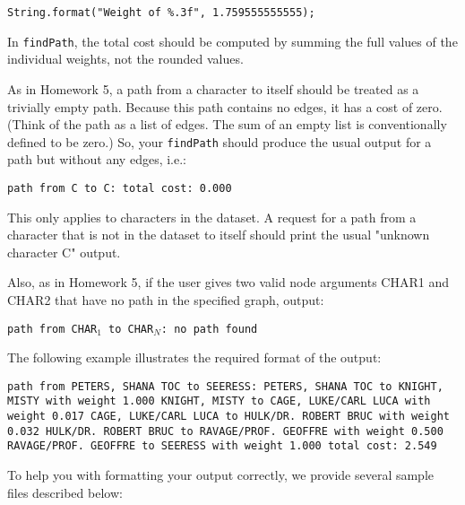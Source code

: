 \documentclass[11pt]{article}
\begin{document}
\noindent \texttt{String.format("Weight of \%.3f", 1.759555555555);}

\noindent In \texttt{findPath}, the total cost should be computed by summing the full values of the individual weights, not the rounded values.

\noindent As in Homework 5, a path from a character to itself should be treated as a trivially empty path. Because this path contains no edges, it has a cost of zero. (Think of the path as a list of edges. The sum of an empty list is conventionally defined to be zero.) So, your \texttt{findPath} should produce the usual output for a path but without any edges, i.e.:

\noindent \texttt{path from C to C:
\newline
total cost: 0.000}

\noindent This only applies to characters in the dataset. A request for a path from a character that is not in the dataset to itself should print the usual "unknown character C" output.

\noindent Also, as in Homework 5, if the user gives two valid node arguments CHAR1 and CHAR2 that have no path in the specified graph, output:

\noindent \texttt{path from CHAR$_1$ to CHAR$_N$:
\newline
no path found}

\newpage

\noindent The following example illustrates the required format of the output:

\noindent \texttt{path from PETERS, SHANA TOC to SEERESS:
\newline
PETERS, SHANA TOC to KNIGHT, MISTY with weight 1.000
\newline
KNIGHT, MISTY to CAGE, LUKE/CARL LUCA with weight 0.017
\newline
CAGE, LUKE/CARL LUCA to HULK/DR. ROBERT BRUC with weight 0.032
\newline
HULK/DR. ROBERT BRUC to RAVAGE/PROF. GEOFFRE with weight 0.500
\newline
RAVAGE/PROF. GEOFFRE to SEERESS with weight 1.000
\newline
total cost: 2.549}

\noindent To help you with formatting your output correctly, we provide several sample files described below:
\end{document}
